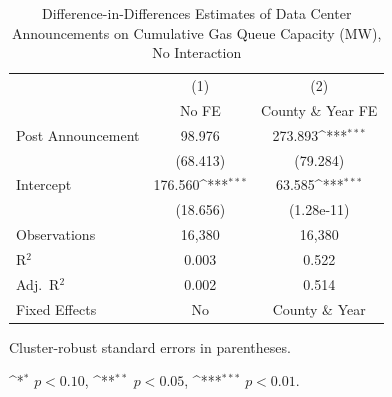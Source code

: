 \documentclass[a4paper,fleqn,longmktitle]{cas-sc}
\newcommand{\sym}[1]{\ifmmode^{#1}\else\(^{#1}\)\fi}
\begin{document}
\begin{table}[htbp]\centering
\caption{Difference-in-Differences Estimates of Data Center Announcements on Cumulative Gas Queue Capacity (MW), No Interaction}
\begin{threeparttable}
\begin{tabular}{lcc}
\toprule
& (1) & (2) \\
& No FE & County \& Year FE \\
\midrule
Post Announcement & 98.976 & 273.893\sym{***} \\
& (68.413) & (79.284) \\
Intercept & 176.560\sym{***} & 63.585\sym{***} \\
& (18.656) & (1.28e-11) \\
\midrule
Observations & 16,380 & 16,380 \\
R$^2$ & 0.003 & 0.522 \\
Adj.\ R$^2$ & 0.002 & 0.514 \\
Fixed Effects & No & County \& Year \\
\bottomrule
\end{tabular}
\begin{tablenotes}[flushleft]
\footnotesize
\item Cluster-robust standard errors in parentheses. 
\item \sym{*} $p<0.10$, \sym{**} $p<0.05$, \sym{***} $p<0.01$. 
\end{tablenotes}
\end{threeparttable}
\label{DIDNGInteract}
\end{table}
\end{document}
